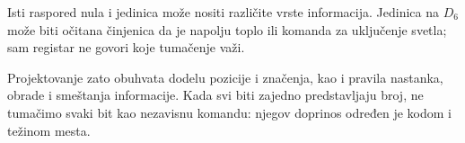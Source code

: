 
Isti raspored nula i jedinica može nositi različite vrste informacija. Jedinica na $D_6$ može biti očitana činjenica da je napolju toplo ili komanda za uključenje svetla; sam registar ne govori koje tumačenje važi.

Projektovanje zato obuhvata dodelu pozicije i značenja, kao i pravila nastanka, obrade i smeštanja informacije. Kada svi biti zajedno predstavljaju broj, ne tumačimo svaki bit kao nezavisnu komandu: njegov doprinos određen je kodom i težinom mesta.
